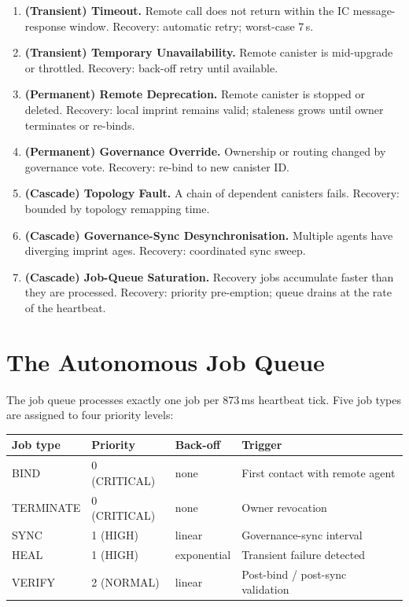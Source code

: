 \documentclass[11pt,a4paper]{article}
\begin{document}
\begin{enumerate}[label=\textbf{F\arabic*.}]
  \item \textbf{(Transient) Timeout.}  Remote call does not return within the
        IC message-response window.  Recovery: automatic retry; worst-case
        7\,s.
  \item \textbf{(Transient) Temporary Unavailability.}  Remote canister is
        mid-upgrade or throttled.  Recovery: back-off retry until available.
  \item \textbf{(Permanent) Remote Deprecation.}  Remote canister is stopped or
        deleted.  Recovery: local imprint remains valid; staleness grows until
        owner terminates or re-binds.
  \item \textbf{(Permanent) Governance Override.}  Ownership or routing changed
        by governance vote.  Recovery: re-bind to new canister ID.
  \item \textbf{(Cascade) Topology Fault.}  A chain of dependent canisters
        fails.  Recovery: bounded by topology remapping time.
  \item \textbf{(Cascade) Governance-Sync Desynchronisation.}  Multiple agents
        have diverging imprint ages.  Recovery: coordinated sync sweep.
  \item \textbf{(Cascade) Job-Queue Saturation.}  Recovery jobs accumulate
        faster than they are processed.  Recovery: priority pre-emption; queue
        drains at the rate of the heartbeat.
\end{enumerate}

\section{The Autonomous Job Queue}
\label{sec:queue}

The job queue processes exactly one job per 873\,ms heartbeat tick.  Five job
types are assigned to four priority levels:

\begin{center}
\begin{tabular}{llll}
\hline
\textbf{Job type} & \textbf{Priority} & \textbf{Back-off} & \textbf{Trigger} \\
\hline
BIND      & 0 (CRITICAL) & none    & First contact with remote agent \\
TERMINATE & 0 (CRITICAL) & none    & Owner revocation \\
SYNC      & 1 (HIGH)     & linear  & Governance-sync interval \\
HEAL      & 1 (HIGH)     & exponential & Transient failure detected \\
VERIFY    & 2 (NORMAL)   & linear  & Post-bind / post-sync validation \\
\hline
\end{tabular}
\end{center}
\end{document}
